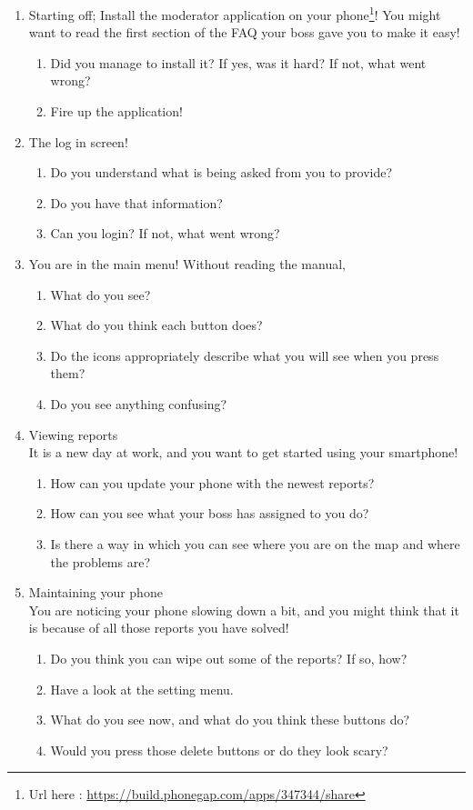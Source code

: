 \documentclass[12pt]{article}
\begin{document}
\begin{enumerate}
\item Starting off; Install the moderator application on your phone\footnote{Url here : \href{https://build.phonegap.com/apps/347344/share}{https://build.phonegap.com/apps/347344/share}}! You might want to read the first section of the FAQ your boss gave you to make it easy!
\begin{enumerate}
\item Did you manage to install it? If yes, was it hard? If not, what went wrong?
\item Fire up the application!
\end{enumerate}

\item The log in screen!
\begin{enumerate}
\item Do you understand what is being asked from you to provide?
\item Do you have that information?
\item Can you login? If not, what went wrong?
\end{enumerate}

\item You are in the main menu! Without reading the manual,
\begin{enumerate}
\item What do you see? 
\item What do you think each button does?
\item Do the icons appropriately describe what you will see when you press them?
\item Do you see anything confusing?
\end{enumerate}

\item Viewing reports\\
It is a new day at work, and you want to get started using your smartphone!
\begin{enumerate}
\item How can you update your phone with the newest reports?
\item How can you see what your boss has assigned to you do?
\item Is there a way in which you can see where you are on the map and where the problems are?
\end{enumerate}

\item Maintaining your phone\\
You are noticing your phone slowing down a bit, and you might think that it is because of all those reports you have solved!
\begin{enumerate}
\item Do you think you can wipe out some of the reports? If so, how?
\item Have a look at the setting menu.
\item What do you see now, and what do you think these buttons do?
\item Would you press those delete buttons or do they look scary?
\end{enumerate}


\end{enumerate}
\end{document}
